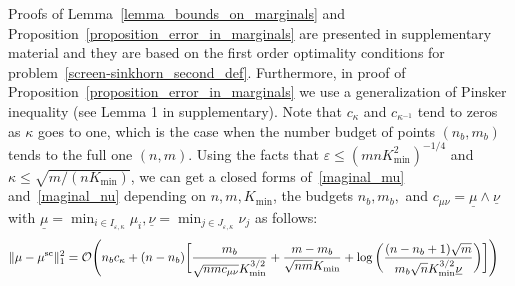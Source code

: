 Proofs of Lemma~\ref{lemma_bounds_on_marginals} and Proposition~\ref{proposition_error_in_marginals} are presented in supplementary material and they are based on the first order optimality conditions for problem~\eqref{screen-sinkhorn_second_def}. 
Furthermore, in proof of Proposition~\ref{proposition_error_in_marginals} we use a generalization of Pinsker inequality (see Lemma 1 in supplementary). 
Note that $c_\kappa$ and $c_{\kappa^{-1}}$ tend to zeros as $\kappa$ goes to one, which is the case when the number budget of points $(n_b,m_b)$ tends to the full one $(n,m)$.
Using the facts that $\varepsilon \leq (mnK_{\min}^2)^{-1/4}$ and $\kappa \leq \sqrt{m/(nK_{\min})}$, we can get a closed forms of~\eqref{maginal_mu} and~\eqref{maginal_nu} depending on $n,m,K_{\min}$, the budgets $n_b,m_b,$ and $c_{\mu\nu} = \underline{\mu}\wedge \underline{\nu}$ with $\underline{\mu} = \min_{i\in I_{\varepsilon,\kappa}}\mu_i, \underline{\nu} = \min_{j\in J_{\varepsilon,\kappa}}\nu_j$ as follows:
\begin{align*}
{\|{\mu} -{\mu}^{\text{sc}}\|^2_1} = \mathcal{O}\Bigg(n_bc_\kappa + (n- n_b) \bigg[\frac{m_b}{\sqrt{nmc_{\mu\nu}}K_{\min}^{3/2}} &+ \frac{m-m_b}{\sqrt{nm}{K_{\min}}}
 + \log\bigg(\frac{(n-n_b+1)\sqrt{m}}{m_b \sqrt{n}K_{\min}^{3/2}\underline{\nu}} 
\bigg)\bigg]\Bigg)
\end{align*}

